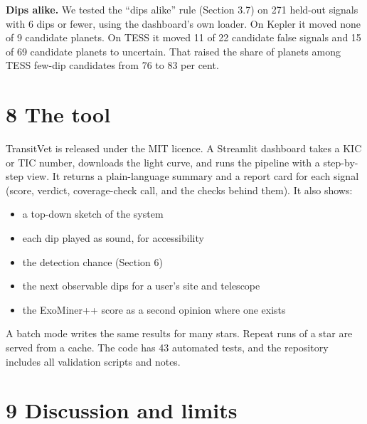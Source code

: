 \documentclass[
]{article}
\providecommand{\tightlist}{%
  \setlength{\itemsep}{0pt}\setlength{\parskip}{0pt}}
\begin{document}
\textbf{Dips alike.} We tested the ``dips alike'' rule (Section 3.7) on
271 held-out signals with 6 dips or fewer, using the dashboard's own
loader. On Kepler it moved none of 9 candidate planets. On TESS it moved
11 of 22 candidate false signals and 15 of 69 candidate planets to
uncertain. That raised the share of planets among TESS few-dip
candidates from 76 to 83 per cent.

\hypertarget{the-tool}{%
\section{8 The tool}\label{the-tool}}

TransitVet is released under the MIT licence. A Streamlit dashboard
takes a KIC or TIC number, downloads the light curve, and runs the
pipeline with a step-by-step view. It returns a plain-language summary
and a report card for each signal (score, verdict, coverage-check call,
and the checks behind them). It also shows:

\begin{itemize}
\tightlist
\item
  a top-down sketch of the system
\item
  each dip played as sound, for accessibility
\item
  the detection chance (Section 6)
\item
  the next observable dips for a user's site and telescope
\item
  the ExoMiner++ score as a second opinion where one exists
\end{itemize}

A batch mode writes the same results for many stars. Repeat runs of a
star are served from a cache. The code has 43 automated tests, and the
repository includes all validation scripts and notes.

\hypertarget{discussion-and-limits}{%
\section{9 Discussion and limits}\label{discussion-and-limits}}
\end{document}
